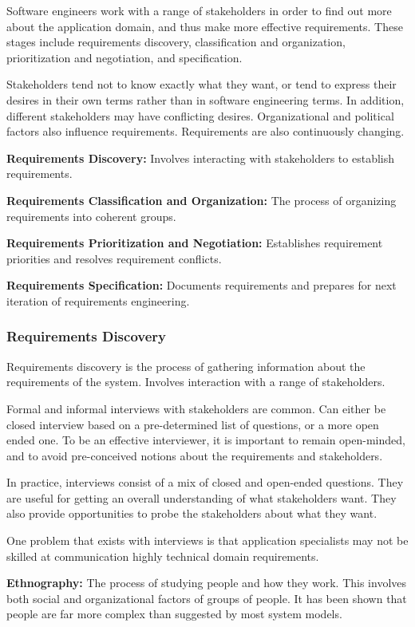 \documentclass[12pt]{article}
\begin{document}
Software engineers work with a range of stakeholders in order to find out more about the application domain, and thus make more effective requirements. These stages include requirements discovery, classification and organization, prioritization and negotiation, and specification.

Stakeholders tend not to know exactly what they want, or tend to express their desires in their own terms rather than in software engineering terms. In addition, different stakeholders may have conflicting desires. Organizational and political factors also influence requirements. Requirements are also continuously changing.

\textbf{Requirements Discovery:} Involves interacting with stakeholders to establish requirements.

\textbf{Requirements Classification and Organization:} The process of organizing requirements into coherent groups.

\textbf{Requirements Prioritization and Negotiation:} Establishes requirement priorities and resolves requirement conflicts.

\textbf{Requirements Specification:} Documents requirements and prepares for next iteration of requirements engineering.

\subsubsection*{Requirements Discovery}

Requirements discovery is the process of gathering information about the requirements of the system. Involves interaction with a range of stakeholders.

Formal and informal interviews with stakeholders are common. Can either be closed interview based on a pre-determined list of questions, or a more open ended one. To be an effective interviewer, it is important to remain open-minded, and to avoid pre-conceived notions about the requirements and stakeholders.

In practice, interviews consist of a mix of closed and open-ended questions. They are useful for getting an overall understanding of what stakeholders want. They also provide opportunities to probe the stakeholders about what they want.

One problem that exists with interviews is that application specialists may not be skilled at communication highly technical domain requirements.

\textbf{Ethnography:} The process of studying people and how they work. This involves both social and organizational factors of groups of people. It has been shown that people are far more complex than suggested by most system models.
\end{document}
